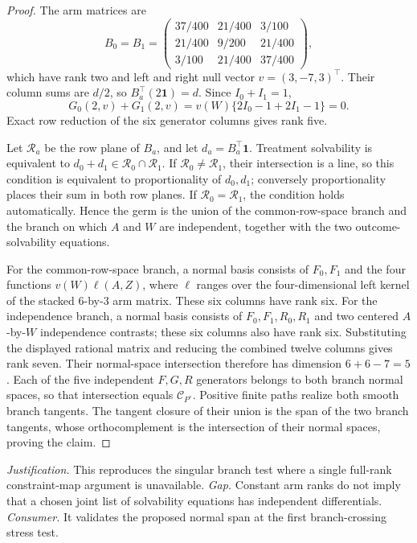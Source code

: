 \documentclass{article}
\begin{document}
\begin{proof}
The arm matrices are
\[
B_0=B_1=\begin{pmatrix}
37/400&21/400&3/100\\
21/400&9/200&21/400\\
3/100&21/400&37/400
\end{pmatrix},
\]
which have rank two and left and right null vector \(v=(3,-7,3)^\top\). Their column sums are \(d/2\), so \(B_a^\top(2\mathbf 1)=d\).  Since \(I_0+I_1=1\),
\[
G_0(2,v)+G_1(2,v)
=v(W)\{2I_0-1+2I_1-1\}=0.
\]
Exact row reduction of the six generator columns gives rank five.

Let \(\mathcal R_a\) be the row plane of \(B_a\), and let \(d_a=B_a^\top\mathbf1\).  Treatment solvability is equivalent to \(d_0+d_1\in\mathcal R_0\cap\mathcal R_1\).  If \(\mathcal R_0\ne\mathcal R_1\), their intersection is a line, so this condition is equivalent to proportionality of \(d_0,d_1\); conversely proportionality places their sum in both row planes.  If \(\mathcal R_0=\mathcal R_1\), the condition holds automatically.  Hence the germ is the union of the common-row-space branch and the branch on which \(A\) and \(W\) are independent, together with the two outcome-solvability equations.

For the common-row-space branch, a normal basis consists of \(F_0,F_1\) and the four functions \(v(W)\ell(A,Z)\), where \(\ell\) ranges over the four-dimensional left kernel of the stacked \(6\)-by-\(3\) arm matrix.  These six columns have rank six.  For the independence branch, a normal basis consists of \(F_0,F_1,R_0,R_1\) and two centered \(A\)-by-\(W\) independence contrasts; these six columns also have rank six.  Substituting the displayed rational matrix and reducing the combined twelve columns gives rank seven.  Their normal-space intersection therefore has dimension \(6+6-7=5\).  Each of the five independent \(F,G,R\) generators belongs to both branch normal spaces, so that intersection equals \(\mathcal C_{P^\circ}\).  Positive finite paths realize both smooth branch tangents.  The tangent closure of their union is the span of the two branch tangents, whose orthocomplement is the intersection of their normal spaces, proving the claim.
\end{proof}
\par\smallskip\noindent \textit{Justification.} This reproduces the singular branch test where a single full-rank constraint-map argument is unavailable. \textit{Gap.} Constant arm ranks do not imply that a chosen joint list of solvability equations has independent differentials. \textit{Consumer.} It validates the proposed normal span at the first branch-crossing stress test.
\end{document}
